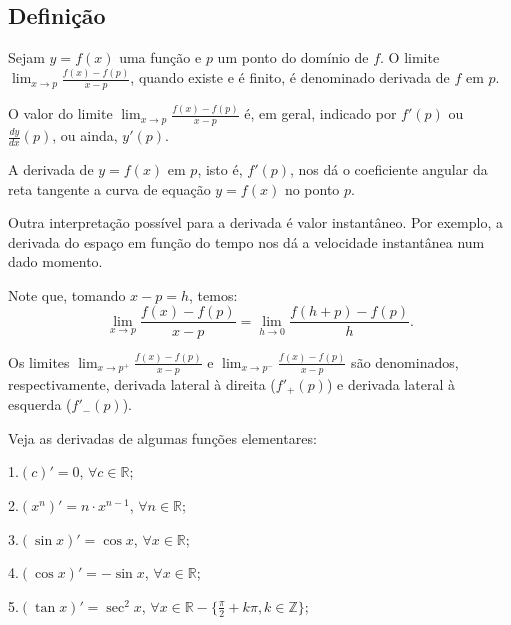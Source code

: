 \documentclass{article}
\begin{document}
{\begin{newpage}
\subsection{Definição}
\hspace{12pt} Sejam $y=f(x)$ uma função e $p$ um ponto do domínio de $f$. O limite $\displaystyle{\lim_{x\to p}}\displaystyle{\frac{f(x)-f(p)}{x-p}}$, quando existe e é finito, é denominado derivada de $f$ em $p$.
\par O valor do limite $\displaystyle{\lim_{x\to p}}\displaystyle{\frac{f(x)-f(p)}{x-p}}$ é, em geral, indicado por $f'(p)$ ou $\displaystyle{\frac{dy}{dx}(p)}$, ou ainda, $y'(p)$.
\par A derivada de $y=f(x)$ em $p$, isto é, $f'(p)$, nos dá o coeficiente angular da reta tangente a curva de equação $y=f(x)$ no ponto $p$.
\par Outra interpretação possível para a derivada é valor instantâneo. Por exemplo, a derivada do espaço em função do tempo nos dá a velocidade instantânea num dado momento.
\par Note que, tomando $x-p=h$, temos:
$$ \displaystyle{\lim_{x\to p}}\displaystyle{\frac{f(x)-f(p)}{x-p}} = \displaystyle{\lim_{h\to 0}}\displaystyle{\frac{f(h+p)-f(p)}{h}}.$$
\par Os limites $\displaystyle{\lim_{x\to p^{+}}}\displaystyle{\frac{f(x)-f(p)}{x-p}}$ e $\displaystyle{\lim_{x\to p^{-}}}\displaystyle{\frac{f(x)-f(p)}{x-p}}$ são denominados, respectivamente, derivada lateral à direita ($f'_{+}(p)$) e derivada lateral à esquerda ($f'_{-}(p)$).
\par
\vspace{0.3cm}
Veja as derivadas de algumas funções elementares:
\par
\vspace{0.3cm}
1.$(c)'=0$, $\forall c\in\mathbb{R}$;
\par
\vspace{0.3cm}
2.$(x^n)'=n\cdot x^{n-1}$, $\forall n\in\mathbb{R}$;
\par
\vspace{0.3cm}
3.$(\sin{x})'=\cos{x}$, $\forall x\in\mathbb{R}$;
\par
\vspace{0.3cm}
4.$(\cos{x})'=-\sin{x}$, $\forall x\in\mathbb{R}$;
\par
\vspace{0.3cm}
5.$(\tan{x})'=\sec^{2}{x}$, $\forall x\in\mathbb{R}-\Big\{\displaystyle{\frac{\pi }{2}} + k\pi, k\in\mathbb{Z}\Big\}$;
\par
\vspace{0.3cm}

\end{newpage}}
\end{document}
